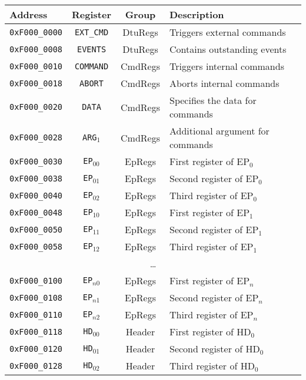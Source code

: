 \documentclass[a4paper,11pt,draft]{article}
\begin{document}
\vspace{2ex}
\noindent
\begin{tabular}{ p{3cm} | c | c | l }
  \textbf{Address} & \textbf{Register} & \textbf{Group} & \textbf{Description} \\
  \hline
  \texttt{0xF000\_0000} & \texttt{EXT\_CMD} & DtuRegs & Triggers external commands \\
  \hline
  \texttt{0xF000\_0008} & \texttt{EVENTS} & DtuRegs & Contains outstanding events \\
  \hline
  \texttt{0xF000\_0010} & \texttt{COMMAND} & CmdRegs & Triggers internal commands \\
  \hline
  \texttt{0xF000\_0018} & \texttt{ABORT} & CmdRegs & Aborts internal commands \\
  \hline
  \texttt{0xF000\_0020} & \texttt{DATA} & CmdRegs & Specifies the data for commands \\
  \hline
  \texttt{0xF000\_0028} & \texttt{ARG$_1$} & CmdRegs & Additional argument for commands \\
  \hline
  \texttt{0xF000\_0030} & \texttt{EP$_{00}$} & EpRegs & First register of EP$_0$ \\
  \texttt{0xF000\_0038} & \texttt{EP$_{01}$} & EpRegs & Second register of EP$_0$ \\
  \texttt{0xF000\_0040} & \texttt{EP$_{02}$} & EpRegs & Third register of EP$_0$ \\
  \hline
  \texttt{0xF000\_0048} & \texttt{EP$_{10}$} & EpRegs & First register of EP$_1$ \\
  \texttt{0xF000\_0050} & \texttt{EP$_{11}$} & EpRegs & Second register of EP$_1$ \\
  \texttt{0xF000\_0058} & \texttt{EP$_{12}$} & EpRegs & Third register of EP$_1$ \\
  \hline
  \multicolumn{4}{c}{\dots} \\
  \hline
  \texttt{0xF000\_0100} & \texttt{EP$_{n0}$} & EpRegs & First register of EP$_{n}$ \\
  \texttt{0xF000\_0108} & \texttt{EP$_{n1}$} & EpRegs & Second register of EP$_{n}$ \\
  \texttt{0xF000\_0110} & \texttt{EP$_{n2}$} & EpRegs & Third register of EP$_{n}$ \\
  \hline
  \texttt{0xF000\_0118} & \texttt{HD$_{00}$} & Header & First register of HD$_0$ \\
  \texttt{0xF000\_0120} & \texttt{HD$_{01}$} & Header & Second register of HD$_0$ \\
  \texttt{0xF000\_0128} & \texttt{HD$_{02}$} & Header & Third register of HD$_0$ \\

\end{tabular}
\end{document}
